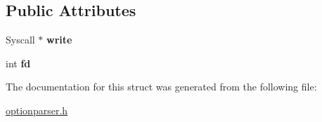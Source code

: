\subsection*{Public Attributes}
\begin{DoxyCompactItemize}
\item 
Syscall $\ast$ {\bfseries write}\hypertarget{structoption_1_1PrintUsageImplementation_1_1SyscallWriter_adc72b04cd74c69d0219b8b26589b8e5e}{}\label{structoption_1_1PrintUsageImplementation_1_1SyscallWriter_adc72b04cd74c69d0219b8b26589b8e5e}

\item 
int {\bfseries fd}\hypertarget{structoption_1_1PrintUsageImplementation_1_1SyscallWriter_ae79409e3f85f8dbaa7ef87bb8d7fcf8a}{}\label{structoption_1_1PrintUsageImplementation_1_1SyscallWriter_ae79409e3f85f8dbaa7ef87bb8d7fcf8a}

\end{DoxyCompactItemize}


The documentation for this struct was generated from the following file\+:\begin{DoxyCompactItemize}
\item 
\hyperlink{optionparser_8h}{optionparser.\+h}\end{DoxyCompactItemize}
